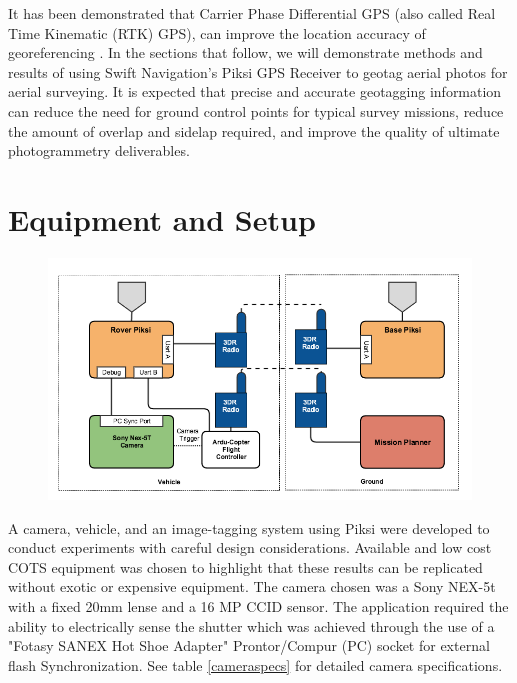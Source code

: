 \documentclass{article}
\begin{document}
It has been demonstrated that Carrier Phase Differential GPS (also called Real Time Kinematic (RTK) GPS), can improve the location accuracy of georeferencing \cite{sensefly2}.  In the sections that follow, we will demonstrate methods and results of using Swift Navigation's Piksi GPS Receiver to geotag aerial photos for aerial surveying.  It is expected that precise and accurate geotagging information can reduce the need for ground control points for typical survey missions, reduce the amount of overlap and sidelap required, and improve the quality of ultimate photogrammetry deliverables.

\section{Equipment and Setup}
\label{sec:equipment}
\begin{figure}[h]
\includegraphics[width=7in]{images/flow_charts/uav_piksi_flow_chart.png}
\end{figure}

\label{sec:equipment}
A camera, vehicle, and an image-tagging system using Piksi were developed to conduct experiments with careful design considerations.  Available and low cost COTS equipment was chosen to highlight that these results can be replicated without exotic or expensive equipment.  The camera chosen was a Sony NEX-5t with a fixed 20mm lense and a 16 MP CCID sensor.  The application required the ability to electrically sense the shutter which was achieved through the use of a "Fotasy SANEX Hot Shoe Adapter" Prontor/Compur (PC) socket for external flash Synchronization.  See table \ref{cameraspecs} for detailed camera specifications.
\end{document}
